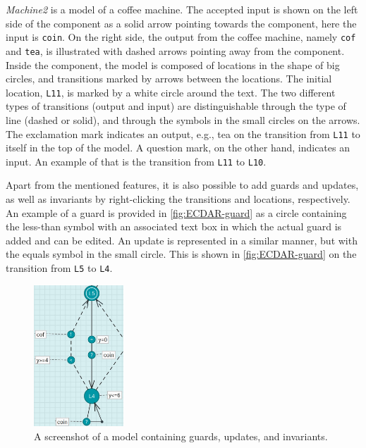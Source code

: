 \textit{Machine2} is a model of a coffee machine. The accepted input is shown on the left side of the component as a solid arrow pointing towards the component, here the input is \texttt{coin}. On the right side, the output from the coffee machine, namely \texttt{cof} and \texttt{tea}, is illustrated with dashed arrows pointing away from the component. 
Inside the component, the model is composed of locations in the shape of big circles, and transitions marked by arrows between the locations. The initial location, \texttt{L11}, is marked by a white circle around the text.
The two different types of transitions (output and input) are distinguishable through the type of line (dashed or solid), and through the symbols in the small circles on the arrows. The exclamation mark indicates an output, e.g., tea on the transition from \texttt{L11} to itself in the top of the model. A question mark, on the other hand, indicates an input. An example of that is the transition from \texttt{L11} to \texttt{L10}.

Apart from the mentioned features, it is also possible to add guards and updates, as well as invariants by right-clicking the transitions and locations, respectively. An example of a guard is provided in \autoref{fig:ECDAR-guard} as a circle containing the less-than symbol with an associated text box in which the actual guard is added and can be edited. 
An update is represented in a similar manner, but with the equals symbol in the small circle. This is shown in \autoref{fig:ECDAR-guard} on the transition from \texttt{L5} to \texttt{L4}.

\begin{figure}[H]
    \centering
    \includegraphics[width=0.3\textwidth]{common/figures/ecdar-guards.jpg}
    \caption{A screenshot of a model containing guards, updates, and invariants.}
    \label{fig:ECDAR-guard}
\end{figure}

